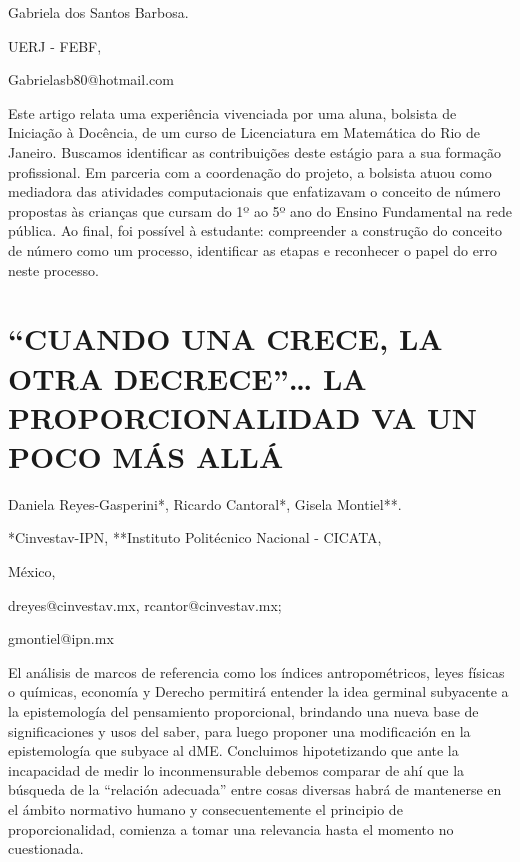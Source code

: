 \begin{datos}

Gabriela dos Santos Barbosa.

UERJ - FEBF,

Gabrielasb80@hotmail.com

\end{datos}

Este artigo relata uma experiência vivenciada por uma aluna, bolsista
de Iniciação à Docência, de um curso de Licenciatura em Matemática
do Rio de Janeiro. Buscamos identificar as contribuições deste estágio
para a sua formação profissional. Em parceria com a coordenação do
projeto, a bolsista atuou como mediadora das atividades computacionais
que enfatizavam o conceito de número propostas às crianças que cursam
do 1º ao 5º ano do Ensino Fundamental na rede pública. Ao final, foi
possível à estudante: compreender a construção do conceito de número
como um processo, identificar as etapas e reconhecer o papel do erro
neste processo.


\section{“CUANDO UNA CRECE, LA OTRA DECRECE”… LA PROPORCIONALIDAD VA UN POCO
MÁS ALLÁ }

\begin{datos}

Daniela Reyes-Gasperini{*}, Ricardo Cantoral{*}, Gisela Montiel{*}{*}.

{*}Cinvestav-IPN, {*}{*}Instituto Politécnico Nacional - CICATA, 

México,

dreyes@cinvestav.mx, rcantor@cinvestav.mx;

gmontiel@ipn.mx 

\end{datos}

El análisis de marcos de referencia como los índices antropométricos,
leyes físicas o químicas, economía y Derecho permitirá entender la
idea germinal subyacente a la epistemología del pensamiento proporcional,
brindando una nueva base de significaciones y usos del saber, para
luego proponer una modificación en la epistemología que subyace al
dME. Concluimos hipotetizando que ante la incapacidad de medir lo
inconmensurable debemos comparar de ahí que la búsqueda de la “relación
adecuada” entre cosas diversas habrá de mantenerse en el ámbito normativo
humano y consecuentemente el principio de proporcionalidad, comienza
a tomar una relevancia hasta el momento no cuestionada.


